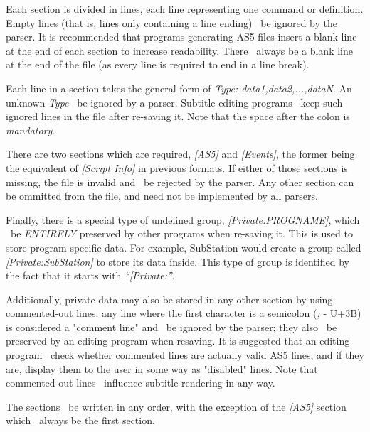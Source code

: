 \documentclass{spec}
\begin{document}
Each section is divided in lines, each line representing one command or definition. Empty
lines (that is, lines only containing a line ending) \must\ be ignored by the parser.
It is recommended that programs generating AS5 files insert a blank line at the end of each
section to increase readability. There \must\ always be a blank line at the end of the file
(as every line is required to end in a line break).

Each line in a section takes the general form of \textit{Type: data1,data2,...,dataN}. An
unknown \textit{Type} \must\ be ignored by a parser. Subtitle editing programs \should\ keep
such ignored lines in the file after re-saving it. Note that the space after the colon is \emph{mandatory}.

There are two sections which are required, \emph{[AS5]} and \emph{[Events]}, the former being
the equivalent of \emph{[Script Info]} in previous formats. If either of those sections is
missing, the file is invalid and \must\ be rejected by the parser. Any other section
can be ommitted from the file, and need not be implemented by all parsers.

Finally, there is a special type of undefined group, \emph{[Private:PROGNAME]}, which 
\must\ be \emph{ENTIRELY} preserved by other programs when re-saving it. This is used to
store program-specific data. For example, SubStation would create a group called
\emph{[Private:SubStation]} to store its data inside. This type of group is identified
by the fact that it starts with \emph{``[Private:''}.

Additionally, private data may also be stored in any other section by using commented-out
lines: any line where the first character is a semicolon (\textit{;} - U+3B) is considered a
"comment line" and \must\ be ignored by the parser; they also \must\ be preserved by an editing program
when resaving. It is suggested that an editing program \should\ check whether commented lines are
actually valid AS5 lines, and if they are, display them to the user in some way as "disabled" lines.
Note that commented out lines \mustnot\ influence subtitle rendering in any way.

The sections \may\ be written in any order, with the exception of the \emph{[AS5]} section which
\must\ always be the first section.
\end{document}
